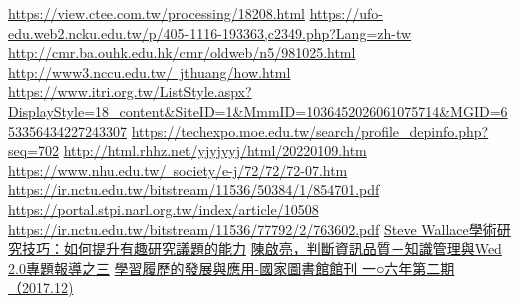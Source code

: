 \begin{thebibliography}{99}
\href{https://view.ctee.com.tw/processing/18208.html}{https://view.ctee.com.tw/processing/18208.html}
\href{https://ufo-edu.web2.ncku.edu.tw/p/405-1116-193363,c2349.php?Lang=zh-tw}{https://ufo-edu.web2.ncku.edu.tw/p/405-1116-193363,c2349.php?Lang=zh-tw}
\href{http://cmr.ba.ouhk.edu.hk/cmr/oldweb/n5/981025.html}{http://cmr.ba.ouhk.edu.hk/cmr/oldweb/n5/981025.html}
\href{http://www3.nccu.edu.tw/~jthuang/how.html}{http://www3.nccu.edu.tw/~jthuang/how.html}
\href{https://www.itri.org.tw/ListStyle.aspx?DisplayStyle=18\_content\&SiteID=1\&MmmID=1036452026061075714\&MGID=653356434227243307}{https://www.itri.org.tw/ListStyle.aspx?DisplayStyle=18\_content\&SiteID=1\&MmmID=1036452026061075714\&MGID=653356434227243307}
\href{https://techexpo.moe.edu.tw/search/profile\_depinfo.php?seq=702}{https://techexpo.moe.edu.tw/search/profile\_depinfo.php?seq=702}
\href{http://html.rhhz.net/yjyjyyj/html/20220109.htm}{http://html.rhhz.net/yjyjyyj/html/20220109.htm}
\href{https://www.nhu.edu.tw/~society/e-j/72/72/72-07.htm}{https://www.nhu.edu.tw/~society/e-j/72/72/72-07.htm}
\href{https://ir.nctu.edu.tw/bitstream/11536/50384/1/854701.pdf}{https://ir.nctu.edu.tw/bitstream/11536/50384/1/854701.pdf}
\href{https://portal.stpi.narl.org.tw/index/article/10508}{https://portal.stpi.narl.org.tw/index/article/10508}
\href{https://ir.nctu.edu.tw/bitstream/11536/77792/2/763602.pdf}{https://ir.nctu.edu.tw/bitstream/11536/77792/2/763602.pdf}
\href{Steve Wallace學術研究技巧：如何提升有趣研究議題的能力}{Steve Wallace學術研究技巧：如何提升有趣研究議題的能力}
\href{陳啟亮，判斷資訊品質－知識管理與Wed 2.0專題報導之三}{陳啟亮，判斷資訊品質－知識管理與Wed 2.0專題報導之三}
\href{學習履歷的發展與應用-國家圖書館館刊 一○六年第二期（2017.12)}{學習履歷的發展與應用-國家圖書館館刊 一○六年第二期（2017.12)}
\href{}{}

\end{thebibliography}
\par